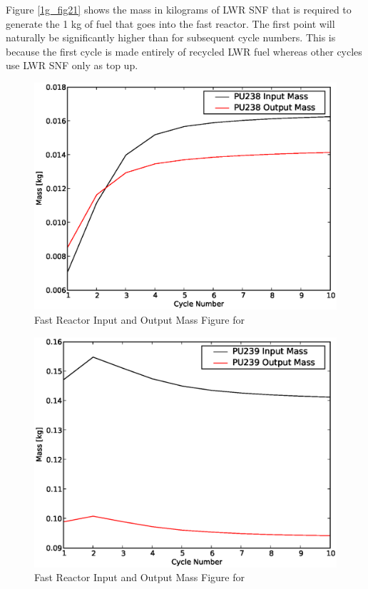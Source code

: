 Figure \ref{1g_fig21} shows the mass in kilograms of LWR SNF that is required to generate 
the 1 kg of fuel that goes into the fast reactor. The first point will naturally be 
significantly higher than for subsequent cycle numbers.  This is because the first cycle 
is made entirely of recycled LWR fuel whereas other cycles use LWR SNF only as top up.  

\begin{figure}[htbp]
\caption{Fast Reactor Input and Output Mass Figure for }
\label{1g_fig22}
\begin{center}
\includegraphics[scale=0.5]{one_group_method/figs/Fig22.eps}
\end{center}
\end{figure}

\begin{figure}[htbp]
\caption{Fast Reactor Input and Output Mass Figure for }
\label{1g_fig23}
\begin{center}
\includegraphics[scale=0.5]{one_group_method/figs/Fig23.eps}
\end{center}
\end{figure}

